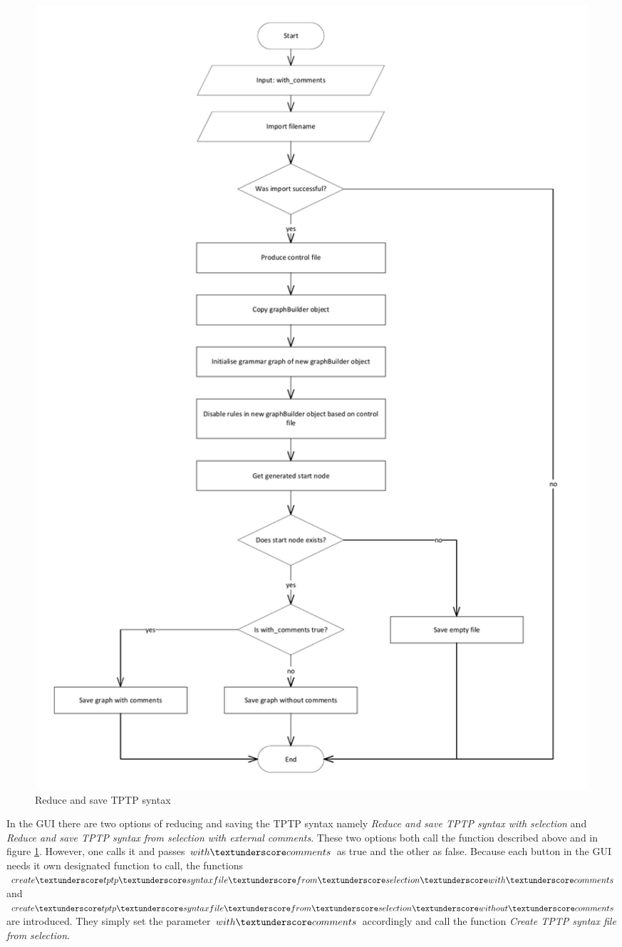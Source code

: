 \begin{figure}[H]
\includegraphics[width=1.05\textwidth]{images/implementation_reduce_and_save_tptp_syntax.pdf}
\caption{Reduce and save \ac{TPTP} syntax}
\label{fig:ImplementationGUIReduceandSave}
\end{figure}

In the GUI there are two options of reducing and saving the \ac{TPTP} syntax namely \textit{Reduce and save \ac{TPTP} syntax with selection} and \textit{Reduce and save \ac{TPTP} syntax from selection with external comments}.
These two options both call the function described above and in figure \ref{fig:ImplementationGUIReduceandSave}. However, one calls it and passes $with\textunderscore comments$ as true and the other as false.
Because each button in the GUI needs it own designated function to call, the functions $create\textunderscore tptp\textunderscore syntax file\textunderscore from\textunderscore selection\textunderscore with\textunderscore comments$ and $create\textunderscore tptp\textunderscore syntax file\textunderscore from\textunderscore selection\textunderscore without\textunderscore comments$ are introduced.
They simply set the parameter $with\textunderscore comments$ accordingly and call the function \textit{Create \ac{TPTP} syntax file from selection}.

